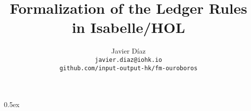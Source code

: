 \documentclass[a4paper,11pt]{article}
\begin{document}
\title{Formalization of the Ledger Rules in Isabelle/HOL}
\author{Javier D\'iaz\\\small\texttt{javier.diaz@iohk.io}\\\small\texttt{github.com/input-output-hk/fm-ouroboros}}

\maketitle

\tableofcontents

\parindent 0pt\parskip 0.5ex


\end{document}
